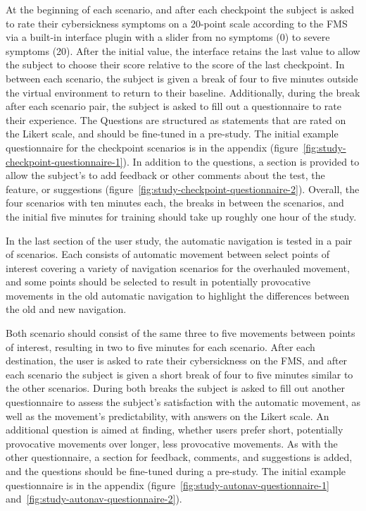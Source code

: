 At the beginning of each scenario, and after each checkpoint the subject is asked to rate their cybersickness symptoms
on a 20-point scale according to the FMS via a built-in interface plugin with a slider from no symptoms (0) to severe
symptoms (20).
After the initial value, the interface retains the last value to allow the subject to choose their score relative to
the score of the last checkpoint.
In between each scenario, the subject is given a break of four to five minutes outside the virtual environment to
return to their baseline.
Additionally, during the break after each scenario pair, the subject is asked to fill out a questionnaire to rate
their experience.
The Questions are structured as statements that are rated on the Likert scale, and should be fine-tuned in a pre-study.
The initial example questionnaire for the checkpoint scenarios is in the appendix
(figure~\ref{fig:study-checkpoint-questionnaire-1}).
In addition to the questions, a section is provided to allow the subject's to add feedback or other comments
about the test, the feature, or suggestions (figure~\ref{fig:study-checkpoint-questionnaire-2}).
Overall, the four scenarios with ten minutes each, the breaks in between the scenarios, and the initial five minutes for
training should take up roughly one hour of the study.

In the last section of the user study, the automatic navigation is tested in a pair of scenarios.
Each consists of automatic movement between select points of interest covering a variety of navigation scenarios for
the overhauled movement, and some points should be selected to result in potentially provocative movements in the old
automatic navigation to highlight the differences between the old and new navigation.

Both scenario should consist of the same three to five movements between points of interest, resulting in two to five
minutes for each scenario.
After each destination, the user is asked to rate their cybersickness on the FMS, and after each scenario the subject is
given a short break of four to five minutes similar to the other scenarios.
During both breaks the subject is asked to fill out another questionnaire to assess the subject's satisfaction with
the automatic movement, as well as the movement's predictability, with answers on the Likert scale.
An additional question is aimed at finding, whether users prefer short, potentially provocative movements over longer,
less provocative movements.
As with the other questionnaire, a section for feedback, comments, and suggestions is added, and the questions
should be fine-tuned during a pre-study.
The initial example questionnaire is in the appendix (figure~\ref{fig:study-autonav-questionnaire-1}
and~\ref{fig:study-autonav-questionnaire-2}).



